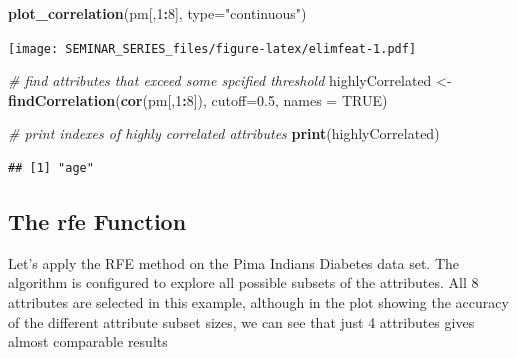\documentclass[]{book}
\newenvironment{Shaded}{\begin{snugshade}}{\end{snugshade}}
\newcommand{\KeywordTok}[1]{\textcolor[rgb]{0.13,0.29,0.53}{\textbf{#1}}}
\newcommand{\DataTypeTok}[1]{\textcolor[rgb]{0.13,0.29,0.53}{#1}}
\newcommand{\DecValTok}[1]{\textcolor[rgb]{0.00,0.00,0.81}{#1}}
\newcommand{\FloatTok}[1]{\textcolor[rgb]{0.00,0.00,0.81}{#1}}
\newcommand{\StringTok}[1]{\textcolor[rgb]{0.31,0.60,0.02}{#1}}
\newcommand{\CommentTok}[1]{\textcolor[rgb]{0.56,0.35,0.01}{\textit{#1}}}
\newcommand{\OtherTok}[1]{\textcolor[rgb]{0.56,0.35,0.01}{#1}}
\newcommand{\OperatorTok}[1]{\textcolor[rgb]{0.81,0.36,0.00}{\textbf{#1}}}
\newcommand{\NormalTok}[1]{#1}
\begin{document}
\begin{Shaded}
\begin{Highlighting}[]
\KeywordTok{plot_correlation}\NormalTok{(pm[,}\DecValTok{1}\OperatorTok{:}\DecValTok{8}\NormalTok{], }\DataTypeTok{type=}\StringTok{"continuous"}\NormalTok{)}
\end{Highlighting}
\end{Shaded}

\texttt{[image: SEMINAR\_SERIES\_files/figure-latex/elimfeat-1.pdf]}

\begin{Shaded}
\begin{Highlighting}[]
\CommentTok{# find attributes that exceed some spcified threshold}
\NormalTok{highlyCorrelated <-}\StringTok{ }\KeywordTok{findCorrelation}\NormalTok{(}\KeywordTok{cor}\NormalTok{(pm[,}\DecValTok{1}\OperatorTok{:}\DecValTok{8}\NormalTok{]),}
                                    \DataTypeTok{cutoff=}\FloatTok{0.5}\NormalTok{,}
                                    \DataTypeTok{names =} \OtherTok{TRUE}\NormalTok{)}

\CommentTok{# print indexes of highly correlated attributes}
\KeywordTok{print}\NormalTok{(highlyCorrelated)}
\end{Highlighting}
\end{Shaded}

\begin{verbatim}
## [1] "age"
\end{verbatim}

\subsection{The rfe Function}\label{the-rfe-function}

Let's apply the RFE method on the Pima Indians Diabetes data set. The
algorithm is configured to explore all possible subsets of the
attributes. All 8 attributes are selected in this example, although in
the plot showing the accuracy of the different attribute subset sizes,
we can see that just 4 attributes gives almost comparable results
\end{document}
